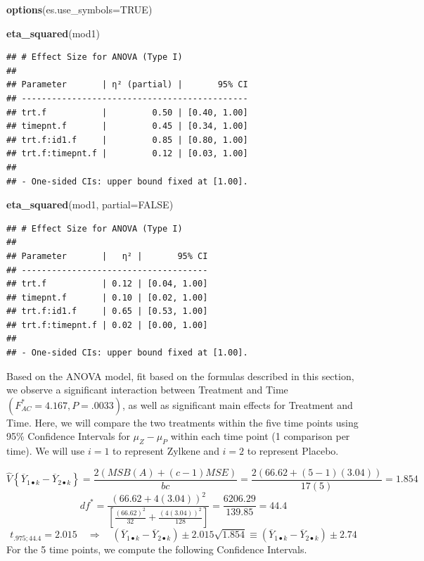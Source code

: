 \documentclass[
]{book}
\newenvironment{Shaded}{\begin{snugshade}}{\end{snugshade}}
\newcommand{\AttributeTok}[1]{\textcolor[rgb]{0.13,0.29,0.53}{#1}}
\newcommand{\ConstantTok}[1]{\textcolor[rgb]{0.56,0.35,0.01}{#1}}
\newcommand{\FunctionTok}[1]{\textcolor[rgb]{0.13,0.29,0.53}{\textbf{#1}}}
\newcommand{\NormalTok}[1]{#1}
\begin{document}
\begin{Shaded}
\begin{Highlighting}[]
\FunctionTok{options}\NormalTok{(}\AttributeTok{es.use\_symbols=}\ConstantTok{TRUE}\NormalTok{)}

\FunctionTok{eta\_squared}\NormalTok{(mod1)}
\end{Highlighting}
\end{Shaded}

\begin{verbatim}
## # Effect Size for ANOVA (Type I)
## 
## Parameter       | η² (partial) |       95% CI
## ---------------------------------------------
## trt.f           |         0.50 | [0.40, 1.00]
## timepnt.f       |         0.45 | [0.34, 1.00]
## trt.f:id1.f     |         0.85 | [0.80, 1.00]
## trt.f:timepnt.f |         0.12 | [0.03, 1.00]
## 
## - One-sided CIs: upper bound fixed at [1.00].
\end{verbatim}

\begin{Shaded}
\begin{Highlighting}[]
\FunctionTok{eta\_squared}\NormalTok{(mod1, }\AttributeTok{partial=}\ConstantTok{FALSE}\NormalTok{)}
\end{Highlighting}
\end{Shaded}

\begin{verbatim}
## # Effect Size for ANOVA (Type I)
## 
## Parameter       |   η² |       95% CI
## -------------------------------------
## trt.f           | 0.12 | [0.04, 1.00]
## timepnt.f       | 0.10 | [0.02, 1.00]
## trt.f:id1.f     | 0.65 | [0.53, 1.00]
## trt.f:timepnt.f | 0.02 | [0.00, 1.00]
## 
## - One-sided CIs: upper bound fixed at [1.00].
\end{verbatim}

Based on the ANOVA model, fit based on the formulas described in this
section, we observe a significant interaction between Treatment and Time
\(\left(F_{AC}^*=4.167, P=.0033\right)\), as well as significant main
effects for Treatment and Time. Here, we will compare the two treatments
within the five time points using 95\% Confidence Intervals for
\(\mu_Z-\mu_P\) within each time point (1 comparison per time). We will
use \(i=1\) to represent Zylkene and \(i=2\) to represent Placebo.

\[
\hat{V}\left\{\overline{Y}_{1\bullet k}-\overline{Y}_{2\bullet k}\right\} =
\frac{2\left(MSB(A)+(c-1)MSE\right)}{bc} =
\frac{2\left(66.62+(5-1)(3.04)\right)}{17(5)}=1.854
\] \[
df^* = \frac{\left(66.62+4(3.04)\right)^2}{
       \left[\frac{(66.62)^2}{32}+\frac{(4(3.04))^2}{128}\right]}=
       \frac{6206.29}{139.85}=44.4
\] \[
t_{.975;44.4}=2.015 \quad \Rightarrow 
\quad
\left(\overline{Y}_{1\bullet k}-\overline{Y}_{2\bullet k}\right)\pm
2.015\sqrt{1.854}
 \equiv  
\left(\overline{Y}_{1\bullet k}-\overline{Y}_{2\bullet k}\right)\pm
2.74
\] For the 5 time points, we compute the following Confidence Intervals.
\end{document}
